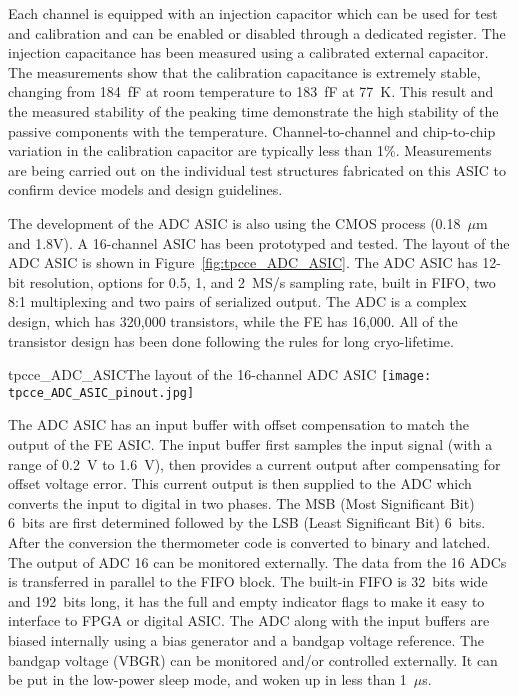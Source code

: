 Each channel is equipped with an injection capacitor which can be used
for test and calibration and can be enabled or disabled through a
dedicated register. The injection capacitance has been measured using 
a calibrated external capacitor. The measurements show
that the calibration capacitance is extremely stable, changing from
184~fF at room temperature to 183~fF at 77~K. This result and the measured
stability of the peaking time demonstrate the high stability of the
passive components with the temperature. Channel-to-channel and chip-to-chip
variation in the calibration capacitor are typically less than 1\%. Measurements are being carried
out on the individual test structures fabricated on this ASIC to
confirm device models and design guidelines.

The development of the ADC ASIC is also using the CMOS process (0.18~$\mu$m and 1.8V).
A 16-channel ASIC has been prototyped and tested.
The layout of the ADC ASIC is shown in Figure~\ref{fig:tpcce_ADC_ASIC}. 
The ADC ASIC has 12-bit resolution, options for 0.5, 1, and 2~MS/s sampling rate, built in FIFO, 
two 8:1 multiplexing and two pairs of serialized output.
The ADC is a complex design, which has 320,000 transistors, while the FE has 16,000.
All of the transistor design has been done following the rules for long cryo-lifetime.

\begin{cdrfigure}{tpcce_ADC_ASIC}{The layout of the 16-channel ADC ASIC}
\texttt{[image: tpcce\_ADC\_ASIC\_pinout.jpg]} %
\end{cdrfigure}

The ADC ASIC has an input buffer with offset compensation to match the output of the FE ASIC.
The input buffer first samples the input signal (with a range of 0.2~V to 1.6~V),
then provides a current output after compensating for offset voltage error.
This current output is then supplied to the ADC which converts the input to digital in two phases.
The MSB (Most Significant Bit) 6~bits are first determined followed by the LSB (Least Significant Bit) 6~bits.
After the conversion the thermometer code is converted to binary and latched.
The output of ADC 16 can be monitored externally.
The data from the 16 ADCs is transferred in parallel to the FIFO block.
The built-in FIFO is 32~bits wide and 192~bits long,
it has the full and empty indicator flags to make it easy to interface to FPGA or digital ASIC.
The ADC along with the input buffers are biased internally using a bias generator and a bandgap voltage reference.
The bandgap voltage (VBGR) can be monitored and/or controlled externally.
It can be put in the low-power sleep mode, and woken up in less than 1~$\mu$s.

